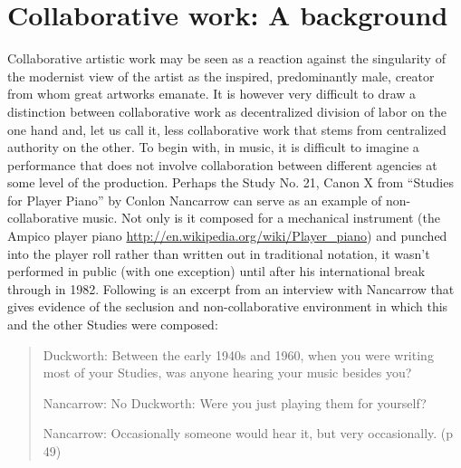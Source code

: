 \section{Collaborative work: A background }
\label{sec:coll-work:-backgr-1}

Collaborative artistic work may be seen as a reaction against the
singularity of the modernist view of the artist as the inspired,
predominantly male, creator from whom great artworks emanate. It is
however very difficult to draw a distinction between collaborative
work as decentralized division of labor on the one hand and, let us
call it, less collaborative work that stems from centralized authority
on the other. To begin with, in music, it is difficult to imagine a
performance that does not involve collaboration between different
agencies at some level of the production. Perhaps the Study No. 21,
Canon X from ``Studies for Player Piano'' by Conlon Nancarrow can
serve as an example of non-collaborative music. Not only is it
composed for a mechanical instrument (the Ampico player piano
\url{http://en.wikipedia.org/wiki/Player_piano}) and punched into the
player roll rather than written out in traditional notation, it wasn't
performed in public (with one exception) until after his international
break through in 1982. Following is an excerpt from an interview with
Nancarrow that gives evidence of the seclusion and non-collaborative
environment in which this and the other Studies were composed:

\begin{quote}
  Duckworth: Between the early 1940s and 1960, when you were writing
  most of your Studies, was anyone hearing your music besides you?

  Nancarrow: No Duckworth: Were you just playing them for yourself?

  Nancarrow: Occasionally someone would hear it, but very
  occasionally. (p 49)
\end{quote}

